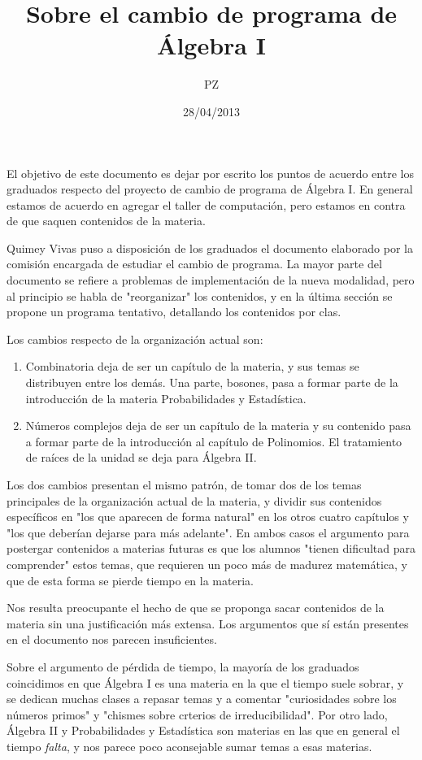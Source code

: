 \documentclass[11pt,fleqn]{article}
\title{Sobre el cambio de programa de Álgebra I}
\date{28/04/2013}
\author{PZ}
\begin{document}
\maketitle

El objetivo de este documento es dejar por escrito los puntos de acuerdo entre los
graduados respecto del proyecto de cambio de programa de Álgebra I. En general estamos de
acuerdo en agregar el taller de computación, pero estamos en contra de que saquen
contenidos de la materia. 

Quimey Vivas puso a disposición de los graduados el documento elaborado por la comisión
encargada de estudiar el cambio de programa. La mayor parte del documento se refiere a
problemas de implementación de la nueva modalidad, pero al principio se habla de
"reorganizar" los contenidos, y en la última sección se propone un programa tentativo,
detallando los contenidos por clas. 

Los cambios respecto de la organización actual son: 
\begin{enumerate}
  \item Combinatoria deja de ser un capítulo de la materia, y sus temas se distribuyen entre
  los demás. Una parte, bosones, pasa a formar parte de la introducción de la materia
  Probabilidades y Estadística.

  \item Números complejos deja de ser un capítulo de la materia y su contenido pasa a
  formar parte de la introducción al capítulo de Polinomios. El tratamiento de raíces de
  la unidad se deja para Álgebra II. 
\end{enumerate}
Los dos cambios presentan el mismo patrón, de tomar dos de los temas principales de la
organización actual de la materia, y dividir sus contenidos específicos en "los que
aparecen de forma natural" en los otros cuatro capítulos y "los que deberían dejarse para
más adelante". En ambos casos el argumento para postergar contenidos a materias futuras es
que los alumnos "tienen dificultad para comprender" estos temas, que requieren un poco más
de madurez matemática, y que de esta forma se pierde tiempo en la materia.

Nos resulta preocupante el hecho de que se proponga sacar contenidos de la materia sin una
justificación más extensa. Los argumentos que sí están presentes en el documento nos
parecen insuficientes.

Sobre el argumento de pérdida de tiempo, la mayoría de los graduados coincidimos en que
Álgebra I es una materia en la que el tiempo suele sobrar, y se dedican muchas clases a
repasar temas y a comentar "curiosidades sobre los números primos" y "chismes sobre
crterios de irreducibilidad". Por otro lado, Álgebra II y Probabilidades y Estadística son
materias en las que en general el tiempo \emph{falta}, y nos parece poco aconsejable sumar
temas a esas materias.
\end{document}
